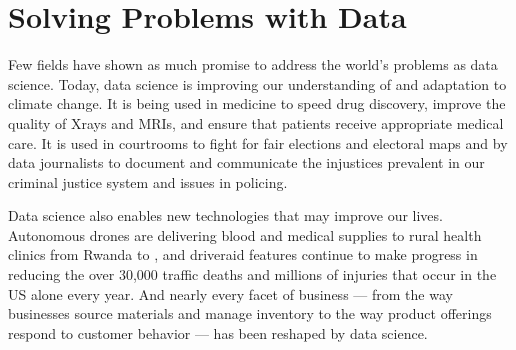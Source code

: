 \documentclass[letterpaper,10pt,english]{jupyterBook}
\begin{document}
\chapter{Solving Problems with Data}
\label{\detokenize{10_introduction/10_solving_problems_with_data:solving-problems-with-data}}\label{\detokenize{10_introduction/10_solving_problems_with_data::doc}}
\sphinxAtStartPar
Few fields have shown as much promise to address the world’s problems as data science. Today, data science is improving our understanding of and adaptation to climate change. It is being used in medicine to speed drug discovery, improve the quality of X\sphinxhyphen{}rays and MRIs, and ensure that patients receive appropriate medical care. It is used in courtrooms to fight for fair elections and electoral maps and by data journalists to document and communicate the injustices prevalent in our criminal justice system and issues in policing.

\sphinxAtStartPar
Data science also enables new technologies that may improve our lives. Autonomous drones are delivering blood and medical supplies to rural health clinics from Rwanda to , and driver\sphinxhyphen{}aid features continue to make progress in reducing the over 30,000 traffic deaths and millions of injuries that occur in the US alone every year. And nearly every facet of business — from the way businesses source materials and manage inventory to the way product offerings respond to customer behavior — has been reshaped by data science.
\end{document}
